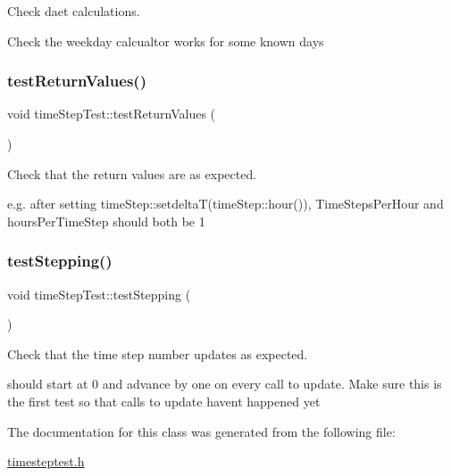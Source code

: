 Check daet calculations. 

Check the weekday calcualtor works for some known days \mbox{\label{classtimeStepTest_abb17f1970e1ec459c524ef87870f651f}} 
\subsubsection{\texorpdfstring{test\+Return\+Values()}{testReturnValues()}}
{\footnotesize\ttfamily void time\+Step\+Test\+::test\+Return\+Values (\begin{DoxyParamCaption}{ }\end{DoxyParamCaption})\hspace{0.3cm}{\ttfamily [inline]}}



Check that the return values are as expected. 

e.\+g. after setting time\+Step\+::setdelta\+T(time\+Step\+::hour()), Time\+Steps\+Per\+Hour and hours\+Per\+Time\+Step should both be 1 \mbox{\label{classtimeStepTest_a8853eb9214716d678e9c341470582fec}} 
\subsubsection{\texorpdfstring{test\+Stepping()}{testStepping()}}
{\footnotesize\ttfamily void time\+Step\+Test\+::test\+Stepping (\begin{DoxyParamCaption}{ }\end{DoxyParamCaption})\hspace{0.3cm}{\ttfamily [inline]}}



Check that the time step number updates as expected. 

should start at 0 and advance by one on every call to update. Make sure this is the first test so that calls to update haven\textquotesingle{}t happened yet 

The documentation for this class was generated from the following file\+:\begin{DoxyCompactItemize}
\item 
\mbox{\hyperlink{timesteptest_8h}{timesteptest.\+h}}\end{DoxyCompactItemize}
